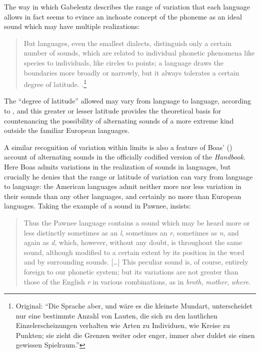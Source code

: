 \documentclass[output=paper]{langscibook}
\begin{document}
The way in which Gabelentz describes the range of variation that each language allows in fact seems to evince an inchoate concept of the phoneme as an ideal sound which may have multiple realizations:

\begin{quotation}
But languages, even the smallest dialects, distinguish only a certain number of sounds, which are related to individual phonetic phenomena like species to individuals, like circles to points; a language draws the boundaries more broadly or narrowly, but it always tolerates a certain degree of latitude. \citep[35]{Gabelentz20161891}.\footnote{Original: ``Die Sprache aber, und wäre es die kleinste Mundart, unterscheidet nur eine bestimmte Anzahl von Lauten, die sich zu den lautlichen Einzelerscheinungen verhalten wie Arten zu Individuen, wie Kreise zu Punkten; sie zieht die Grenzen weiter oder enger, immer aber duldet sie einen gewissen Spielraum.''}
\end{quotation}
 
The ``degree of latitude'' allowed may vary from language to language, according to \citet[197--198]{Gabelentz20161891}, and this greater or lesser latitude provides the theoretical basis for countenancing the possibility of alternating sounds of a more extreme kind outside the familiar European languages.

A similar recognition of variation within limits is also a feature of Boas' (\citeyear{Boas1911}) account of alternating sounds in the officially codified version of the \emph{Handbook}. Here Boas admits variations in the realization of sounds in languages, but crucially he denies that the range or latitude of variation can vary from language to language: the American languages admit neither more nor less variation in their sounds than any other languages, and certainly no more than European languages. Taking the example of a sound in Pawnee, \citet[17]{Boas1911} insists:

\begin{quotation}
Thus the Pawnee language contains a sound which may be heard more or less distinctly sometimes as an \emph{l}, sometimes an \emph{r}, sometimes as \emph{n}, and again as \emph{d}, which, however, without any doubt, is throughout the same sound, although modified to a certain extent by its position in the word and by surrounding sounds. […] This peculiar sound is, of course, entirely foreign to our phonetic system; but its variations are not greater than those of the English \emph{r} in various combinations, as in \emph{broth}, \emph{mother}, \emph{where}. \citep[17]{Boas1911}
\end{quotation}
\end{document}
